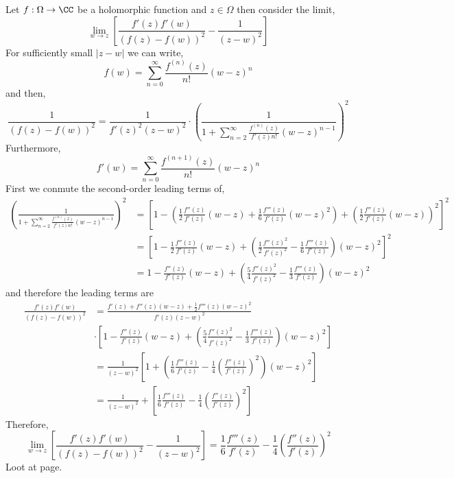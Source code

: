 \documentclass[12pt]{article}
\begin{document}
Let $f : \Omega \to \CC$ be a holomorphic function and $z \in \Omega$ then consider the limit,
\[ \lim_{w \to z} \left[ \frac{f'(z) f'(w)}{(f(z) - f(w))^2} - \frac{1}{(z - w)^2} \right] \]
For sufficiently small $|z - w|$ we can write,
\[ f(w) = \sum_{n = 0}^\infty \frac{f^{(n)}(z)}{n!} (w - z)^n \]
and then,
\[ \frac{1}{(f(z) - f(w))^2} = \frac{1}{f'(z)^2 (z - w)^2} \cdot \left( \frac{1}{1 + \sum\limits_{n = 2}^\infty \frac{f^{(n)}(z)}{f'(z) n!} (w - z)^{n-1}} \right)^2 \]
Furthermore,
\[ f'(w) = \sum_{n = 0}^\infty \frac{f^{(n+1)}(z)}{n!} (w - z)^{n} \]
First we conmute the second-order leading terms of,
\begin{align*}
\left( \frac{1}{1 + \sum\limits_{n = 2}^\infty \frac{f^{(n)}(z)}{f'(z) n!} (w - z)^{n-1}} \right)^2 & = \left[ 1 - \left(\frac{1}{2} \frac{f''(z)}{f'(z)} (w - z) + \frac{1}{6} \frac{f'''(z)}{f'(z)} (w - z)^2 \right) + \left(\frac{1}{2} \frac{f''(z)}{f'(z)} (w - z) \right)^2 \right]^2
\\
& = \left[ 1 - \frac{1}{2} \frac{f''(z)}{f'(z)} (w - z) + \left( \frac{1}{2} \frac{f''(z)^2}{f'(z)^2} -  \frac{1}{6} \frac{f'''(z)}{f'(z)} \right) (w - z)^2  \right]^2
\\
& = 1 - \frac{f''(z)}{f'(z)} (w - z) + \left( \frac{5}{4} \frac{f''(z)^2}{f'(z)^2} - \frac{1}{3} \frac{f'''(z)}{f'(z)} \right) (w - z)^2  
\end{align*}
and therefore the leading terms are
\begin{align*}
\frac{f'(z) f'(w)}{(f(z) - f(w))^2} & = \frac{f'(z)  + f''(z) (w - z) + \tfrac{1}{2} f'''(z) (w - z)^2 }{f'(z) (z - w)^2} 
\\
& \cdot \left[ 1 - \frac{f''(z)}{f'(z)} (w - z) + \left( \frac{5}{4} \frac{f''(z)^2}{f'(z)^2} - \frac{1}{3} \frac{f'''(z)}{f'(z)} \right) (w - z)^2  \right]
\\
& = \frac{1}{(z - w)^2} \left[ 1 + \left( \frac{1}{6} \frac{f'''(z)}{f'(z)} - \frac{1}{4} \left( \frac{f''(z)}{f'(z)} \right)^2 \right) (w - z)^2 \right] 
\\
& = \frac{1}{(z - w)^2} + \left[ \frac{1}{6} \frac{f'''(z)}{f'(z)} - \frac{1}{4} \left( \frac{f''(z)}{f'(z)} \right)^2 \right]
\end{align*}
Therefore,
\[ \lim_{w \to z} \left[ \frac{f'(z) f'(w)}{(f(z) - f(w))^2} - \frac{1}{(z - w)^2} \right] =  \frac{1}{6} \frac{f'''(z)}{f'(z)} - \frac{1}{4} \left( \frac{f''(z)}{f'(z)} \right)^2 \]
Loot at  page.
\end{document}
